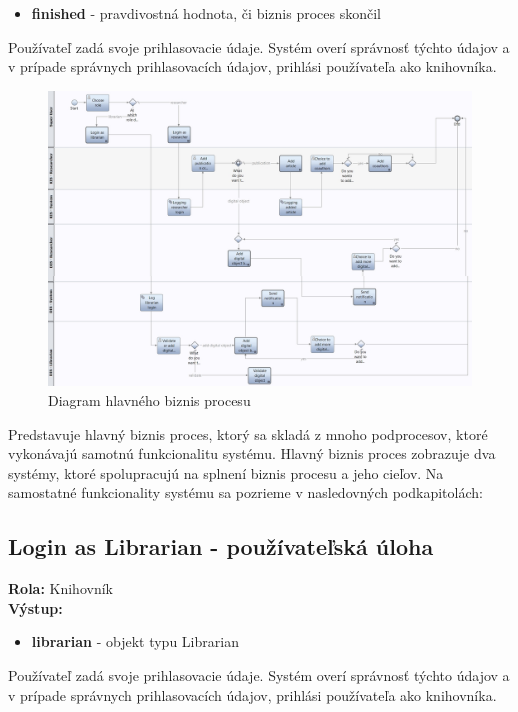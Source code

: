 \documentclass[10pt,oneside,slovak,a4paper]{article}
\begin{document}
\begin{itemize}
\item \textbf{finished} - pravdivostná hodnota, či biznis proces skončil
\end{itemize}

Používateľ zadá svoje prihlasovacie údaje. Systém overí správnosť týchto údajov a v prípade správnych prihlasovacích údajov, prihlási používateľa ako knihovníka.

\begin{figure} [H]
\centering
\includegraphics[scale=0.4]{diagrams/diagUpload.jpg} 
\caption{Diagram hlavného biznis procesu}
\end{figure}

Predstavuje hlavný biznis proces, ktorý sa skladá z mnoho podprocesov, ktoré vykonávajú samotnú funkcionalitu systému. Hlavný biznis proces zobrazuje dva systémy, ktoré spolupracujú na splnení biznis procesu a jeho cieľov. Na samostatné funkcionality systému sa pozrieme v nasledovných podkapitolách:

\subsection{Login as Librarian - používateľská úloha}
\textbf{Rola:} Knihovník\\
\textbf{Výstup:}

\begin{itemize}
\item \textbf{librarian} - objekt typu Librarian
\end{itemize}

Používateľ zadá svoje prihlasovacie údaje. Systém overí správnosť týchto údajov a v prípade správnych prihlasovacích údajov, prihlási používateľa ako knihovníka.
\end{document}
